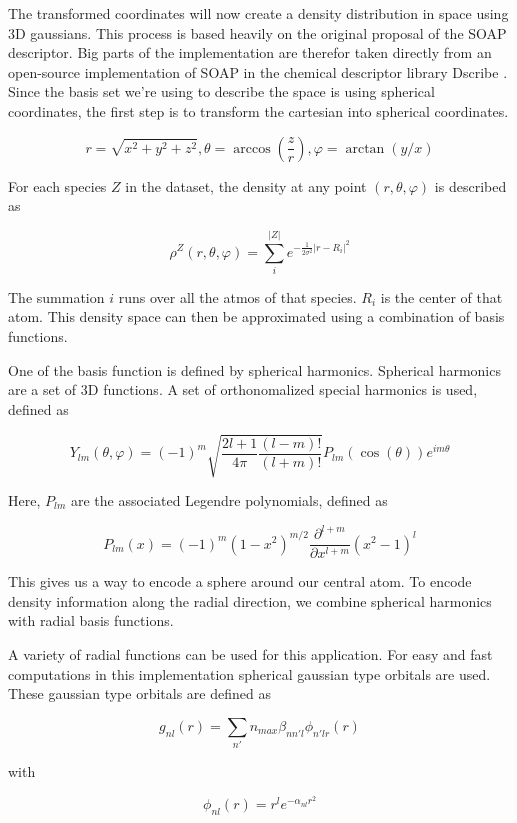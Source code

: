 The transformed coordinates will now create a density distribution in space using 3D gaussians.
This process is based heavily on the original proposal of the SOAP descriptor.
Big parts of the implementation are therefor taken directly from an open-source implementation of SOAP in the chemical descriptor library Dscribe \cite{dscribe}.
\\
Since the basis set we're using to describe the space is using spherical coordinates, the first step is to transform the cartesian into spherical coordinates.

$$
r = \sqrt{x^2 + y^2 + z^2}
,
\theta = \arccos(\frac{z}{r})
,
\varphi = \arctan(y / x)
$$

For each species $Z$ in the dataset, the density at any point $(r, \theta, \varphi)$ is described as

$$\rho^Z(r, \theta, \varphi) = \sum_i^{|Z|} e^{- \frac{1}{2\sigma^2} \vert r - R_i \vert^2 }$$

The summation $i$ runs over all the atmos of that species. $R_i$ is the center of that atom.
This density space can then be approximated using a combination of basis functions.

One of the basis function is defined by spherical harmonics. 
Spherical harmonics are a set of 3D functions.
A set of orthonomalized special harmonics is used, defined as

$$
Y_{lm}(\theta, \varphi) = (-1)^m \sqrt{\frac{2l + 1}{4 \pi} \frac{(l - m)!}{(l + m)!}} P_{lm}(\cos(\theta)) e^{im\theta}
$$

Here, $P_{lm}$ are the associated Legendre polynomials, defined as

$$
P_{lm}(x) = (-1)^m (1-x^2)^{m/2} \frac{\partial^{l+m}}{\partial x^{l+m}}(x^2 - 1)^l
$$ %


This gives us a way to encode a sphere around our central atom. 
To encode density information along the radial direction, we combine spherical harmonics with radial basis functions.

A variety of radial functions can be used for this application.
For easy and fast computations in this implementation spherical gaussian type orbitals are used. 
These gaussian type orbitals are defined as

$$g_{nl}(r) = \sum_{n'}{n_{max}} \beta_{nn'l} \phi_{n'lr}(r) $$

with 

$$\phi_{nl}(r) = r^l e^{-\alpha_{nl}r^2} $$ %


